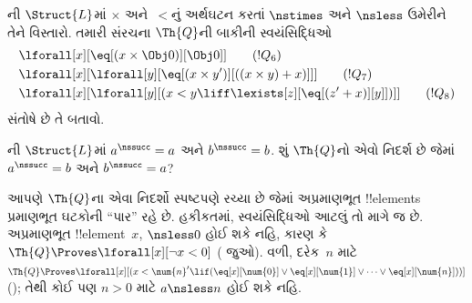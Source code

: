 \documentclass[../../../include/open-logic-section]{subfiles}
\begin{document}
\begin{prob}
ની $\Struct{L}$માં $\times$
અને~$<$નું અર્થઘટન કરતાં $\nstimes$ અને $\nsless$ ઉમેરીને તેને
વિસ્તારો. તમારી સંરચના $\Th{Q}$ની બાકીની સ્વયંસિદ્ધિઓ
\begin{align*}
& \lforall[x][\eq[(x \times \Obj 0)][\Obj 0]] \tag{$!Q_6$}\\ &
  \lforall[x][\lforall[y][\eq[(x \times y')][((x \times y) + x)]]]
  \tag{$!Q_7$}\\ & \lforall[x][\lforall[y][(x < y \liff \lexists[z][\eq[(z'+x)][y]])]] \tag{$!Q_8$}
\end{align*}
સંતોષે છે તે બતાવો.
\end{prob}

\begin{prob}
ની $\Struct{L}$માં
$a^\nssucc=a$ અને $b^\nssucc=b$. શું $\Th{Q}$નો એવો નિદર્શ છે જેમાં
$a^\nssucc=b$ અને $b^\nssucc=a$?
\end{prob}

\begin{explain}
આપણે $\Th{Q}$ના એવા નિદર્શો સ્પષ્ટપણે રચ્યા છે જેમાં અપ્રમાણભૂત
!!{element}s પ્રમાણભૂત ઘટકોની ``પાર'' રહે છે. હકીકતમાં, સ્વયંસિદ્ધિઓ
આટલું તો માગે જ છે. અપ્રમાણભૂત !!{element}~$x$, ${}\nsless0$ હોઈ શકે
નહિ, કારણ કે $\Th{Q}\Proves\lforall[x][\lnot x<0]$
( જુઓ). વળી, દરેક~$n$ માટે
$\Th{Q}\Proves\lforall[x][(x<\num{n}'\lif
(\eq[x][\num{0}]\lor\eq[x][\num{1}]\lor\dots\lor
\eq[x][\num{n}]))]$
(); તેથી કોઈ પણ $n>0$ માટે
$a\nsless n$ હોઈ શકે નહિ.
\end{explain}
\end{document}
